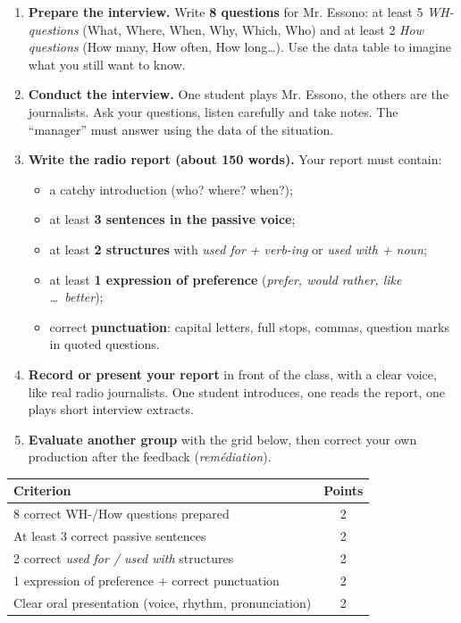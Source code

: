 \documentclass[11pt]{article}
\begin{document}
\begin{enumerate}
\item \textbf{Prepare the interview.} Write \textbf{8 questions} for Mr. Essono: at least 5 \emph{WH-questions} (What, Where, When, Why, Which, Who) and at least 2 \emph{How questions} (How many, How often, How long\ldots). Use the data table to imagine what you still want to know.
\item \textbf{Conduct the interview.} One student plays Mr. Essono, the others are the journalists. Ask your questions, listen carefully and take notes. The ``manager'' must answer using the data of the situation.
\item \textbf{Write the radio report (about 150 words).} Your report must contain:
\begin{itemize}
\item a catchy introduction (who? where? when?);
\item at least \textbf{3 sentences in the passive voice};
\item at least \textbf{2 structures} with \emph{used for + verb-\emph{ing}} or \emph{used with + noun};
\item at least \textbf{1 expression of preference} (\emph{prefer, would rather, like \ldots\ better});
\item correct \textbf{punctuation}: capital letters, full stops, commas, question marks in quoted questions.
\end{itemize}
\item \textbf{Record or present your report} in front of the class, with a clear voice, like real radio journalists. One student introduces, one reads the report, one plays short interview extracts.
\item \textbf{Evaluate another group} with the grid below, then correct your own production after the feedback (\emph{remédiation}).
\end{enumerate}

\begin{methode}
\begin{center}
\begin{tabularx}{\linewidth}{|X|c|}\hline
\rowcolor{popgreenL} \textbf{Criterion} & \textbf{Points} \\ \hline
8 correct WH-/How questions prepared & 2 \\ \hline
At least 3 correct passive sentences & 2 \\ \hline
2 correct \emph{used for / used with} structures & 2 \\ \hline
1 expression of preference + correct punctuation & 2 \\ \hline
Clear oral presentation (voice, rhythm, pronunciation) & 2 \\ \hline
\end{tabularx}
\end{center}
\end{methode}
\end{document}
